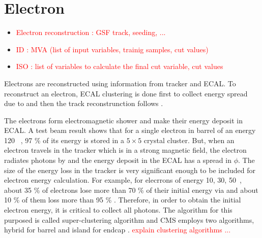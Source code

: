 \section{ Electron }
\begin{itemize}
\item \textcolor{red}{Electron reconstruction : GSF track, seeding, ... }
\item \textcolor{red}{ID  : MVA (list of input variables, trainig samples, cut values)}
\item \textcolor{red}{ISO : list of variables to calculate the final cut variable, cut values  }
\end{itemize}

Electrons are reconstructed using information from tracker and ECAL.
To reconstruct an electron, ECAL clustering is done first to collect energy 
spread due to \brem{} and then the track reconstrunction follows \cite{}.  
 
The electrons form electromagnetic shower and make their energy deposit in ECAL. 
A test beam result shows that for a single electron in barrel of an energy 120~\GeV{} \cite{}, 
97 \%  of its energy is stored in a $5\times5$ crystal cluster. 
But, when an electron travels in the tracker which is in a strong magnetic field, 
the electron radiates photons by \brem{} and the energy deposit 
in the ECAL has a spread in $\phi$. The size of the energy loss in the tracker 
is very significant enough to be included for electron energy calculation. 
For example, for elecrrons of energy 10, 30, 50~\GeV, about 35 \% of electrons 
lose more than 70 \% of their initial energy via \brem{} and about 10 \% of them 
loss more than 95 \% \cite{EPJC 49 1099-1116(2007)}. Therefore, in order to 
obtain the initial electron energy, it is critical to collect all \brem{} photons.
The algorithm for this purposed is called super-clustering algorithm 
and CMS employs two algorithms, hybrid for barrel and island for endcap \cite{}. 
\textcolor{red}{explain clustering algorithms ... } 


